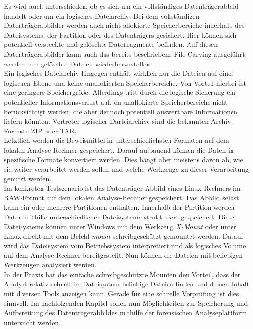 \noindent
Es wird auch unterschieden, ob es sich um ein vollständiges Datenträgerabbild handelt oder um ein logisches Dateiarchiv. Bei dem vollständigen Datenträgerabbilder werden auch nicht allokierte Speicherbereiche innerhalb des Dateisystems, der Partition oder des Datenträgers gesichert. Hier können sich potentiell versteckte und gelöschte Dateifragmente befinden. Auf diesen Datenträgerabbilder kann auch das bereits beschriebene File Carving ausgeführt werden, um gelöschte Dateien wiederherzustellen.\\ 
Ein logisches Dateiarchiv hingegen enthält wirklich nur die Dateien auf einer logischen Ebene und keine unallokierten Speicherbereiche. Von Vorteil hierbei ist eine geringere Speichergröße. Allerdings tritt durch die logische Sicherung ein potentieller Informationsverlust auf, da unallokierte Speicherbereiche nicht berücksichtigt werden, die aber dennoch potentiell auswertbare Informationen liefern könnten. Vertreter logischer Darteiarchive sind die bekannten Archiv-Formate ZIP oder TAR.\\

\noindent
Letztlich werden die Beweismittel in unterschiedlichsten Formaten auf dem lokalen Analyse-Rechner gespeichert. Darauf aufbauend können die Daten in spezifische Formate konvertiert werden. Dies hängt aber meistens davon ab, wie sie weiter verarbeitet werden sollen und welche Werkzeuge zu dieser Verarbeitung genutzt werden.\\

\noindent
Im konkreten Testszenario ist das Datenträger-Abbild eines Linux-Rechners im RAW-Format auf dem lokalen Analyse-Rechner gespeichert. Das Abbild selbst kann ein oder mehrere Partitionen enthalten. Innerhalb der Partition werden Daten mithilfe unterschiedlicher Dateisysteme strukturiert gespeichert. Diese Dateisysteme können unter Windows mit dem Werkzeug \textit{X-Mount} oder unter Linux direkt mit dem Befehl \textit{mount} schreibgeschützt gemountet werden. Darauf wird das Dateisystem vom Betriebssystem interpretiert und als logisches Volume auf dem Analyse-Rechner bereitgestellt. Nun können die Dateien mit beliebigen Werkzeugen analysiert werden.\\

\noindent
In der Praxis hat das einfache schreibgeschützte Mounten den Vorteil, dass der Analyst relativ schnell im Dateisystem beliebige Dateien finden und dessen Inhalt mit diversen Tools anzeigen kann. Gerade für eine schnelle Vorprüfung ist dies sinnvoll. Im nachfolgenden Kapitel sollen nun Möglichkeiten zur Speicherung und Aufbereitung des Datenträgerabbildes mithilfe der forensischen Analyseplattform untersucht werden.\\

